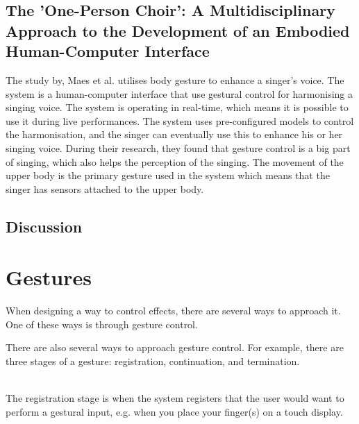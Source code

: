 \subsection{The 'One-Person Choir': A Multidisciplinary Approach to the Development of an Embodied Human-Computer Interface}
The study by, Maes et al. \citep{Maes_2011} utilises body gesture to enhance a singer's voice. The system is a human-computer interface that use gestural control for harmonising a singing voice. The system is operating in real-time, which means it is possible to use it during live performances. The system uses pre-configured models to control the harmonisation, and the singer can eventually use this to enhance his or her singing voice. 
During their research, they found that gesture control is a big part of singing, which also helps the perception of the singing. The movement of the upper body is the primary gesture used in the system which means that the singer has sensors attached to the upper body.

\subsection{Discussion}



\section{Gestures}

When designing a way to control effects, there are several ways to approach it. One of these ways is through gesture control.

There are also several ways to approach gesture control. For example, there are three stages of a gesture: registration, continuation, and termination\citep[pp. 127-134]{Wigdor_2011}.\\

\begin{minipage}{\linewidth}%
\label{Gestures}
\end{minipage}\\

The registration stage is when the system registers that the user would want to perform a gestural input, e.g. when you place your finger(s) on a touch display. 

